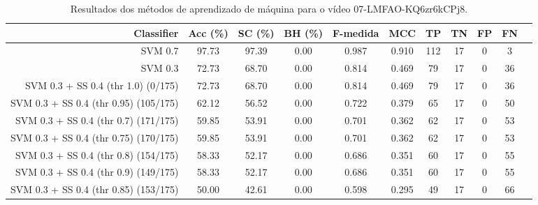 \begin{table}[!htb]
\centering
\caption{Resultados dos métodos de aprendizado de máquina para o vídeo 07-LMFAO-KQ6zr6kCPj8.}
\label{tab:07-LMFAO-KQ6zr6kCPj8}
\begin{tabular}{r|c|c|c|c|c|c|c|c|c|c}
\hline\hline
Classifier & Acc (\%) & SC (\%) & BH (\%) & F-medida & MCC & TP & TN & FP & FN \\ \hline
SVM 0.7 & 97.73 & 97.39 & 0.00 & 0.987 & 0.910 & 112 & 17 & 0 & 3 \\ 
SVM 0.3 & 72.73 & 68.70 & 0.00 & 0.814 & 0.469 & 79 & 17 & 0 & 36 \\ 
SVM 0.3 + SS 0.4 (thr 1.0) (0/175) & 72.73 & 68.70 & 0.00 & 0.814 & 0.469 & 79 & 17 & 0 & 36 \\ 
SVM 0.3 + SS 0.4 (thr 0.95) (105/175) & 62.12 & 56.52 & 0.00 & 0.722 & 0.379 & 65 & 17 & 0 & 50 \\ 
SVM 0.3 + SS 0.4 (thr 0.7) (171/175) & 59.85 & 53.91 & 0.00 & 0.701 & 0.362 & 62 & 17 & 0 & 53 \\ 
SVM 0.3 + SS 0.4 (thr 0.75) (170/175) & 59.85 & 53.91 & 0.00 & 0.701 & 0.362 & 62 & 17 & 0 & 53 \\ 
SVM 0.3 + SS 0.4 (thr 0.8) (154/175) & 58.33 & 52.17 & 0.00 & 0.686 & 0.351 & 60 & 17 & 0 & 55 \\ 
SVM 0.3 + SS 0.4 (thr 0.9) (149/175) & 58.33 & 52.17 & 0.00 & 0.686 & 0.351 & 60 & 17 & 0 & 55 \\ 
SVM 0.3 + SS 0.4 (thr 0.85) (153/175) & 50.00 & 42.61 & 0.00 & 0.598 & 0.295 & 49 & 17 & 0 & 66 \\ 
\hline\hline
\end{tabular}
\end{table}
